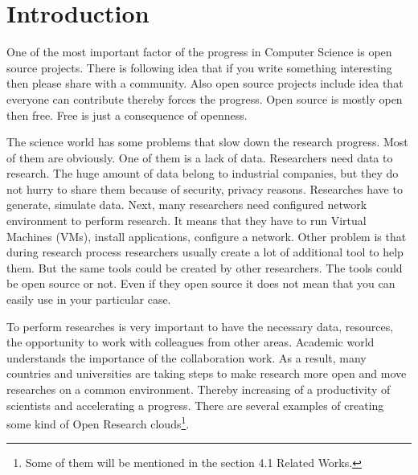 \section{Introduction}

One of the most important factor of the progress in Computer Science is open source projects. There is following idea that if you write something interesting then please share with a community. Also open source projects include idea that everyone can contribute thereby forces the progress. Open source is mostly open then free. Free is just a consequence of openness. 

The science world has some problems that slow down the research progress. Most of them are obviously. One of them is a lack of data. Researchers need data to research. The huge amount of data belong to industrial companies, but they do not hurry to share them because of security, privacy reasons. Researches have to generate, simulate data. Next, many researchers need configured network environment to perform research. It means that they have to run Virtual Machines (VMs), install applications, configure a network. Other problem is that during research process researchers usually create a lot of additional tool to help them. But the same tools could be created by other researchers. The tools could be open source or not. Even if they open source it does not mean that you can easily use in your particular case.  
 
To perform researches is very important to have the necessary data, resources, the opportunity to work with colleagues from other areas. Academic world understands the importance of the collaboration work. As a result, many countries and universities are taking steps to make research more open and move researches on a common environment. Thereby increasing of a productivity of scientists and accelerating a progress. There are several examples of creating some kind of Open Research clouds\footnote{Some of them will be mentioned in the section 4.1 Related Works.}.

